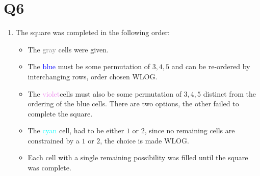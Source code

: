 \documentclass[a4paper, 11pt]{article}
\begin{document}

\pagebreak
\section*{Q6}
\begin{enumerate}[label=(\alph*)]
	\item The square was completed in the following order:
	\begin{itemize}
		\item The \textcolor{gray}{gray} cells were given. 
		\item The \textcolor{blue}{blue} must be some permutation of $3,4,5$ and can be re-ordered by interchanging rows, order chosen WLOG. 
		\item The \textcolor{violet}{violet}{cells} must also be some permutation of $3,4,5$ distinct from the ordering of the blue cells. There are two options, the other failed to complete the square. 
		\item The \textcolor{cyan}{cyan} cell, had to be either $1$ or $2$, since no remaining cells are constrained by a $1$ or $2$, the choice is made WLOG.
		\item Each cell with a single remaining possibility was filled until the square was complete. 
	\end{itemize}



	\begin{center}
\end{center}
\end{enumerate}
\end{document}
